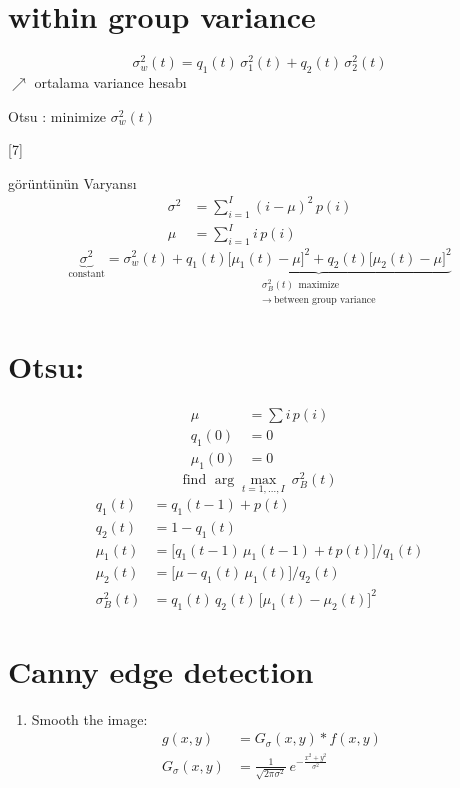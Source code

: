 \documentclass[11pt,a4paper]{article}
\begin{document}
\section{within group variance}
\[ \sigma_w^2(t)=q_1(t)\,\sigma_1^2(t)+q_2(t)\,\sigma_2^2(t) \]
$\nearrow$ ortalama variance hesabı

Otsu : minimize $\sigma_w^2(t)$

[7]

görüntünün Varyansı
\begin{align*}
\sigma^2&=\sum_{i=1}^{I}(i-\mu)^2\,p(i)\\
\mu&=\sum_{i=1}^{I} i\,p(i)
\end{align*}
\[
\underbrace{\sigma^2}_{\text{constant}}=\sigma_w^2(t)+\underbrace{q_1(t)\bigl[\mu_1(t)-\mu\bigr]^2+q_2(t)\bigl[\mu_2(t)-\mu\bigr]^2}_{\substack{\sigma_B^2(t)\ \ \text{maximize}\\ \rightarrow\ \text{between group variance}}}
\]

\section{Otsu:}
\begin{align*}
\mu&=\sum i\,p(i)\\
q_1(0)&=0\\
\mu_1(0)&=0
\end{align*}
\[ \text{find }\arg\max_{t=1,\dots,I}\ \sigma_B^2(t) \]
\begin{align*}
q_1(t)&=q_1(t-1)+p(t)\\
q_2(t)&=1-q_1(t)\\
\mu_1(t)&=\bigl[q_1(t-1)\,\mu_1(t-1)+t\,p(t)\bigr]/q_1(t)\\
\mu_2(t)&=\bigl[\mu-q_1(t)\,\mu_1(t)\bigr]/q_2(t)\\
\sigma_B^2(t)&=q_1(t)\,q_2(t)\,\bigl[\mu_1(t)-\mu_2(t)\bigr]^2
\end{align*}

\section{Canny edge detection}
\begin{enumerate}[label=\arabic*., leftmargin=*]
\item Smooth the image:
\begin{align*}
g(x,y)&=G_\sigma(x,y)\ast f(x,y)\\
G_\sigma(x,y)&=\frac{1}{\sqrt{2\pi\sigma^2}}\,e^{-\frac{x^2+y^2}{\sigma^2}}
\end{align*}
\end{enumerate}
\end{document}
